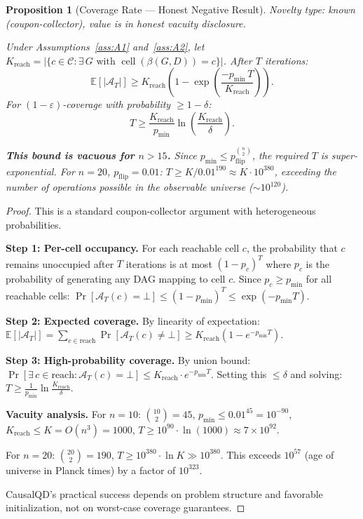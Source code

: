 \documentclass{article}
\theoremstyle{definition}
\theoremstyle{plain}
\newtheorem{proposition}{Proposition}
\theoremstyle{remark}
\DeclareMathOperator{\cell}{cell}
\begin{document}
\begin{proposition}[Coverage Rate --- Honest Negative Result]
\label{prop:coverage}
\emph{Novelty type: known (coupon-collector), value is in honest vacuity
disclosure.}

Under Assumptions~\ref{ass:A1} and~\ref{ass:A2}, let
$K_{\mathrm{reach}} = |\{c \in \mathcal{C} : \exists\, G \text{ with }
\cell(\beta(G,D)) = c\}|$. After $T$ iterations:
$$\mathbb{E}[|\mathcal{A}_T|]
\geq K_{\mathrm{reach}}\!\left(1 - \exp\!\left(\frac{-p_{\min}\, T}{K_{\mathrm{reach}}}\right)\right).$$
For $(1-\varepsilon)$-coverage with probability $\geq 1 - \delta$:
\begin{equation}
  \label{eq:coverage}
  T \geq \frac{K_{\mathrm{reach}}}{p_{\min}}
    \ln\!\left(\frac{K_{\mathrm{reach}}}{\delta}\right).
\end{equation}

\textbf{This bound is vacuous for $n > 15$.} Since
$p_{\min} \leq p_{\mathrm{flip}}^{\binom{n}{2}}$, the required $T$ is
super-exponential. For $n = 20$, $p_{\mathrm{flip}} = 0.01$:
$T \geq K / 0.01^{190} \approx K \cdot 10^{380}$, exceeding the number of
operations possible in the observable universe ($\sim 10^{120}$).
\end{proposition}

\begin{proof}
This is a standard coupon-collector argument with heterogeneous probabilities.

\textbf{Step 1: Per-cell occupancy.}
For each reachable cell $c$, the probability that $c$ remains unoccupied after
$T$ iterations is at most $(1 - p_c)^T$ where $p_c$ is the probability of
generating any DAG mapping to cell $c$. Since $p_c \geq p_{\min}$ for all
reachable cells:
$\Pr[\mathcal{A}_T(c) = \bot] \leq (1 - p_{\min})^T \leq \exp(-p_{\min} T)$.

\textbf{Step 2: Expected coverage.}
By linearity of expectation:
$\mathbb{E}[|\mathcal{A}_T|] = \sum_{c \in \text{reach}} \Pr[\mathcal{A}_T(c) \neq \bot]
\geq K_{\text{reach}}(1 - e^{-p_{\min}T})$.

\textbf{Step 3: High-probability coverage.}
By union bound:
$\Pr[\exists\, c \in \text{reach}: \mathcal{A}_T(c) = \bot]
\leq K_{\text{reach}} \cdot e^{-p_{\min}T}$.
Setting this $\leq \delta$ and solving:
$T \geq \frac{1}{p_{\min}}\ln\frac{K_{\text{reach}}}{\delta}$.

\textbf{Vacuity analysis.}
For $n = 10$: $\binom{10}{2} = 45$, $p_{\min} \leq 0.01^{45} = 10^{-90}$,
$K_{\text{reach}} \leq K = O(n^3) = 1000$,
$T \geq 10^{90} \cdot \ln(1000) \approx 7 \times 10^{92}$.

For $n = 20$: $\binom{20}{2} = 190$,
$T \geq 10^{380} \cdot \ln K \gg 10^{380}$.
This exceeds $10^{57}$ (age of universe in Planck times) by a factor of $10^{323}$.

CausalQD's practical success depends on problem structure and favorable
initialization, not on worst-case coverage guarantees.
\end{proof}
\end{document}
